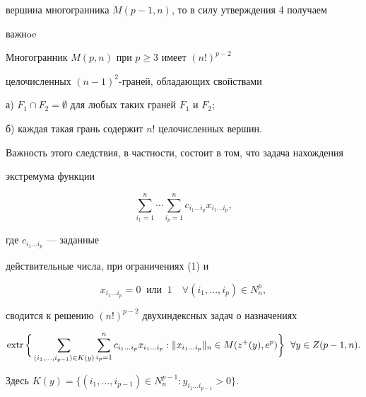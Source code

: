 вершина многогранника $M(p-1,n)$, то в силу утверждения 4 получаем


важнoe





\begin{cor}


Многогранник $M(p,n)$ при $p\geq 3$ имеет $(n!)^{p-2}$


целочисленных $(n-1)^2$-граней, обладающих свойствами





а) $F_1\cap F_2=\emptyset$ для любых таких граней $F_1$ и $F_2$;





б) каждая такая грань содержит $n!$ целочисленных вершин.


\end{cor}





Важность этого следствия, в частности, состоит в том, что задача нахождения


экстремума функции


$$


\sum_{i_1=1}^n\dotsb\sum_{i_p=1}^n c_{i_1\dotsc i_p}x_{i_1\dotsc i_p},


$$


где $c_{i_1\dotsc i_p}$ --- заданные


действительные числа, при ограничениях (1) и


$$


x_{i_1\dotsc i_p}=0\ \text{ или }\ 1\quad


\forall (i_1,\dotsc,i_p)\in N^p_n,


$$


сводится к решению $(n!)^{p-2}$ двухиндексных задач о назначениях


$$


\text{extr\,}\bigg\{\sum_{(i_1,\dotsc,i_{p-1})\in K(y)}\sum_{i_p=1}^n 


c_{i_1\dotsc i_p}x_{i_1\dotsc i_p}: \|x_{i_1\dotsc i_p}\|_n\in


M(z^+(y),e^p)\bigg\}\ \; \forall y\in Z(p-1,n).


$$


Здесь $K(y)=\{(i_1,\dotsc,i_{p-1})\in N^{p-1}_n: y_{i_1\dotsc


i_{p-1}}>0\}$.





